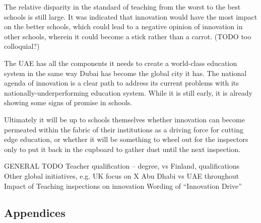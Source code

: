 The relative disparity in the standard of teaching from the worst to the best schools is still large. It was indicated that innovation would have the most impact on the better schools, which could lead to a negative opinion of innovation in other schools, wherein it could become a stick rather than a carrot. (TODO too colloquial?)

The UAE has all the components it needs to create a world-class education system in the same way Dubai has become the global city it has. The national agenda of innovation is a clear path to address its current problems with its nationally-underperforming education system. While it is still early, it is already showing some signs of promise in schools. 

Ultimately it will be up to schools themselves whether innovation can become permeated within the fabric of their institutions as a driving force for cutting edge education, or whether it will be something to wheel out for the inspectors only to put it back in the cupboard to gather dust until the next inspection.

GENERAL TODO
Teacher qualification – degree, vs Finland, qualifications
Other global initiatives, e.g. UK focus on X
Abu Dhabi vs UAE throughout
Impact of Teaching inspections on innovation
Wording of “Innovation Drive”

\subsection{Appendices}

